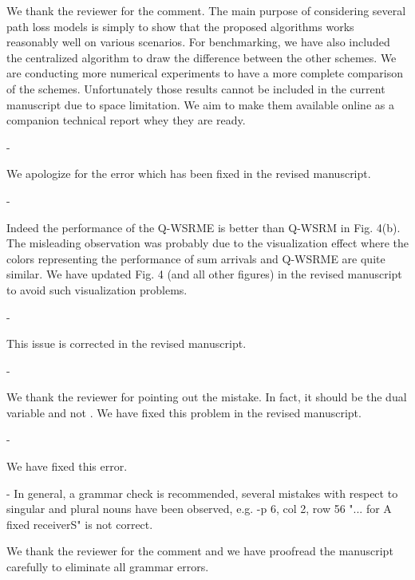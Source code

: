\begin{enumerate}
\begin{enumerate}
	\resp We thank the reviewer for the comment. The main purpose of considering several path loss models is simply to show that the proposed algorithms works reasonably well on various scenarios. For benchmarking, we have also included the centralized algorithm to draw the difference between the other schemes. We are conducting more numerical experiments to have a more complete comparison of the schemes. Unfortunately those results cannot be included in the current manuscript due to space limitation. We aim to make them available online as a companion technical report whey they are ready.
	
	 - 
	
	\resp We apologize for the error which has been fixed in the revised manuscript.
	
	 - 
	
	\resp Indeed the performance of the Q-WSRME is better than Q-WSRM in Fig. 4(b). The misleading observation was probably due to the visualization effect where the colors representing the performance of sum arrivals and Q-WSRME are quite similar. We have updated Fig. 4 (and all other figures) in the revised manuscript to avoid such visualization problems.
	
	 - 
	
	\resp This issue is corrected in the revised manuscript.
	
	 - 
	
	\resp We thank the reviewer for pointing out the mistake. In fact, it should be the dual variable  and not . We have fixed this problem in the revised manuscript.
	
	 - 	
	
	\resp We have fixed this error.
	
	 - {In general, a grammar check is recommended, several mistakes with respect to singular and plural nouns have been observed, e.g. -p 6, col 2, row 56 "... for A fixed receiverS" is not correct.}
	
	\resp We thank the reviewer for the comment and we have proofread the manuscript carefully to eliminate all grammar errors.
	
\end{enumerate}

\end{enumerate}

